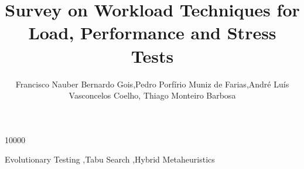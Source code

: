 \documentclass[final,3p,times,twocolumn]{elsarticle}
\begin{document}
\begin{frontmatter}

 10000
\raggedbottom


\title{Survey on Workload Techniques for Load, Performance and Stress Tests}





\author[serpro,unifor,unifor,serpro]{Francisco Nauber Bernardo Gois,Pedro Porf\'irio Muniz de Farias,Andr\'e Lu\'is Vasconcelos Coelho, Thiago Monteiro Barbosa}

\address[serpro]{Serviço Federal de Processamento de Dados,
Avenida Pontes Vieria ,832, Fortaleza, Cear\'a 60130-240}
\address[unifor]{Universidade de Fortaleza, Avenida Pontes Vieria ,832, Fortaleza, Cear\'a 60130-240}

\begin{abstract}

\end{abstract}


\begin{keyword}
Evolutionary Testing \sep Tabu Search \sep Hybrid Metaheuristics


\end{keyword}

\end{frontmatter}
\end{document}
